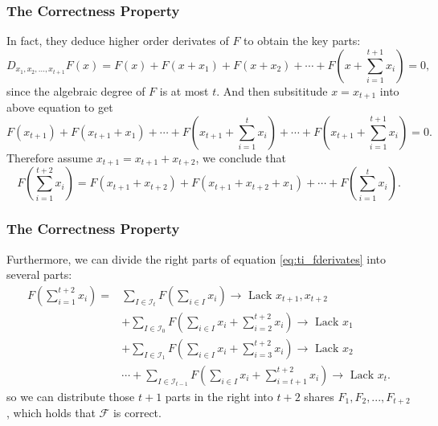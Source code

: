 \documentclass[
    aspectratio=169,                   %
]{beamer}
\begin{document}
    \begin{frame}
        \frametitle{The Correctness Property}
    
        In fact, they deduce higher order derivates of $ F $ to obtain the key parts:
        \[ D_{x_1,x_2,...,x_{t+1}}F(x)=F(x)+F(x+x_1)+F(x+x_2)+\cdots+F\left( x+\sum_{i=1}^{t+1}x_i \right)=0,\]
        since the algebraic degree of $ F $ is at most $ t $. And then subsititude $ x = x_{t+1} $ into above equation to get
        \[F(x_{t+1})+F(x_{t+1}+x_1)+\cdots+F\left( x_{t+1}+\sum_{i=1}^{t}x_i \right)+\cdots+F\left( x_{t+1}+\sum_{i=1}^{t+1}x_i \right)=0.\]
        Therefore  assume $ x_{t+1}=x_{t+1}+x_{t+2} $, we conclude that 
        \begin{equation}\label{eq:ti_fderivates}
        F\left( \sum_{i=1}^{t+2}x_i \right)=F(x_{t+1}+x_{t+2})+F(x_{t+1}+x_{t+2}+x_1)+\cdots+F\left( \sum_{i=1}^{t}x_i \right).
        \end{equation}

    \end{frame}
    \begin{frame}
        \frametitle{The Correctness Property}
    
        Furthermore, we can divide the right parts of equation \eqref{eq:ti_fderivates} into several parts:
        \begin{align*}
        F\left( \sum_{i=1}^{t+2}x_i \right)=& \sum_{I\in\mathcal{I}_t}F\left( \sum_{i\in I}x_i \right)\rightarrow\text{~Lack~} x_{t+1},x_{t+2}\\
        &+ \sum_{I\in\mathcal{I}_0}F\left( \sum_{i\in I}x_i+\sum_{i=2}^{t+2}x_i \right)\rightarrow\text{~Lack~} x_{1}\\
        &+ \sum_{I\in\mathcal{I}_1}F\left( \sum_{i\in I}x_i+\sum_{i=3}^{t+2}x_i \right)\rightarrow\text{~Lack~} x_{2}\\
        &\cdots+ \sum_{I\in\mathcal{I}_{t-1}}F\left( \sum_{i\in I}x_i+\sum_{i=t+1}^{t+2}x_i \right)\rightarrow\text{~Lack~} x_{t}.
        \end{align*}
        so we can distribute those $ t+1 $ parts in the right into $ t+2 $ shares $ F_1,F_2,...,F_{t+2} $, which holds that $ \mathcal{F} $ is correct. 
    \end{frame}
\end{document}
